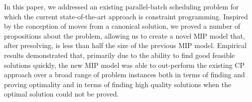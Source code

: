 \documentclass[oribibl]{llncs}
\begin{document}
In this paper, we addressed an existing parallel-batch scheduling
problem for which the current state-of-the-art approach is constraint
programming. Inspired by the conception of moves from a canonical
solution, we proved a number of propositions about the problem, allowing
us to create a novel MIP model that, after presolving, is less than
half the size of the previous MIP model. Empirical results demonstrated
that, primarily due to the ability to find
good feasible solutions quickly, the new MIP model was able to out-perform the
existing CP approach over a broad range of problem instances both in
terms of finding and proving optimality and in terms of finding high
quality solutions when the optimal solution could not be proved.



\end{document}
